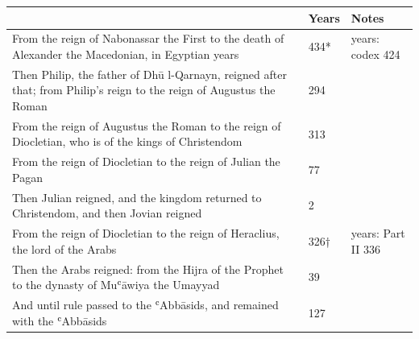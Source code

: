 {\small\setlength{\tabcolsep}{3pt}\begin{longtable}{L{96mm}R{12mm}L{30mm}}
 & \textbf{Years} & \textbf{Notes}\\\hline\endhead
From the reign of Nabonassar the First to the death of Alexander the Macedonian, in Egyptian years & 434* & years: codex 424\\
Then Philip, the father of Dhū l-Qarnayn, reigned after that; from Philip's reign to the reign of Augustus the Roman & 294 & \\
From the reign of Augustus the Roman to the reign of Diocletian, who is of the kings of Christendom & 313 & \\
From the reign of Diocletian to the reign of Julian the Pagan & 77 & \\
Then Julian reigned, and the kingdom returned to Christendom, and then Jovian reigned & 2 & \\
From the reign of Diocletian to the reign of Heraclius, the lord of the Arabs & 326† & years: Part II 336\\
Then the Arabs reigned: from the Hijra of the Prophet to the dynasty of Muʿāwiya the Umayyad & 39 & \\
And until rule passed to the ʿAbbāsids, and remained with the ʿAbbāsids & 127 & \\
\end{longtable}}
\par{}\nopagebreak
